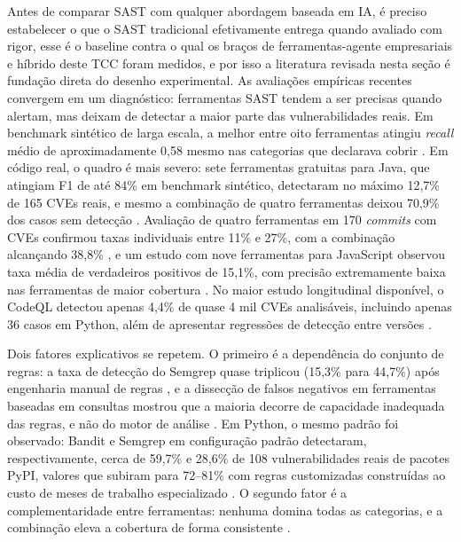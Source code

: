 Antes de comparar SAST com qualquer abordagem baseada em IA, é preciso estabelecer o que o SAST tradicional efetivamente entrega quando avaliado com rigor, esse é o baseline contra o qual os braços de ferramentas-agente empresariais e híbrido deste TCC foram medidos, e por isso a literatura revisada nesta seção é fundação direta do desenho experimental. As avaliações empíricas recentes convergem em um diagnóstico: ferramentas SAST tendem a ser precisas quando alertam, mas deixam de detectar a maior parte das vulnerabilidades reais. Em benchmark sintético de larga escala, a melhor entre oito ferramentas atingiu \textit{recall} médio de aproximadamente 0,58 mesmo nas categorias que declarava cobrir \cite{Esposito2024SASTComparison}. Em código real, o quadro é mais severo: sete ferramentas gratuitas para Java, que atingiam F1 de até 84\% em benchmark sintético, detectaram no máximo 12,7\% de 165 CVEs reais, e mesmo a combinação de quatro ferramentas deixou 70,9\% dos casos sem detecção \cite{Li2023SASTJava}. Avaliação de quatro ferramentas em 170 \textit{commits} com CVEs confirmou taxas individuais entre 11\% e 27\%, com a combinação alcançando 38,8\% \cite{Bennett2024Semgrep}, e um estudo com nove ferramentas para JavaScript observou taxa média de verdadeiros positivos de 15,1\%, com precisão extremamente baixa nas ferramentas de maior cobertura \cite{Brito2023JSSAST}. No maior estudo longitudinal disponível, o CodeQL detectou apenas 4,4\% de quase 4 mil CVEs analisáveis, incluindo apenas 36 casos em Python, além de apresentar regressões de detecção entre versões \cite{Noirot2025CodeQLLongitudinal}.

Dois fatores explicativos se repetem. O primeiro é a dependência do conjunto de regras: a taxa de detecção do Semgrep quase triplicou (15,3\% para 44,7\%) após engenharia manual de regras \cite{Bennett2024Semgrep}, e a dissecção de falsos negativos em ferramentas baseadas em consultas mostrou que a maioria decorre de capacidade inadequada das regras, e não do motor de análise \cite{Li2024SASTCC, Li2023SASTJava}. Em Python, o mesmo padrão foi observado: Bandit e Semgrep em configuração padrão detectaram, respectivamente, cerca de 59,7\% e 28,6\% de 108 vulnerabilidades reais de pacotes PyPI, valores que subiram para 72–81\% com regras customizadas construídas ao custo de meses de trabalho especializado \cite{Marquer2026SAGA}. O segundo fator é a complementaridade entre ferramentas: nenhuma domina todas as categorias, e a combinação eleva a cobertura de forma consistente \cite{Esposito2024SASTComparison, Zhu2024SASTAndroid, Dalaq2025SASTSLR}.

